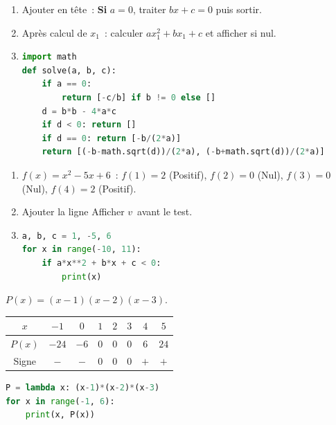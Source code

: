 
\begin{enumerate}
  \item Ajouter en t\^ete~: \textbf{Si} $a=0$, traiter $bx+c=0$ puis sortir.
  \item Apr\`es calcul de $x_1$~: calculer $ax_1^2+bx_1+c$ et afficher si nul.
  \item
\begin{lstlisting}[language=Python]
import math
def solve(a, b, c):
    if a == 0:
        return [-c/b] if b != 0 else []
    d = b*b - 4*a*c
    if d < 0: return []
    if d == 0: return [-b/(2*a)]
    return [(-b-math.sqrt(d))/(2*a), (-b+math.sqrt(d))/(2*a)]
\end{lstlisting}
\end{enumerate}


\begin{enumerate}
  \item $f(x)=x^2-5x+6$~: $f(1)=2$ (Positif), $f(2)=0$ (Nul),
        $f(3)=0$ (Nul), $f(4)=2$ (Positif).
  \item Ajouter la ligne \og Afficher $v$\fg\ avant le test.
  \item
\begin{lstlisting}[language=Python]
a, b, c = 1, -5, 6
for x in range(-10, 11):
    if a*x**2 + b*x + c < 0:
        print(x)
\end{lstlisting}
\end{enumerate}


$P(x)=(x-1)(x-2)(x-3)$.

\begin{center}
\begin{tabular}{c|ccccccc}
$x$ & $-1$ & $0$ & $1$ & $2$ & $3$ & $4$ & $5$ \\\hline
$P(x)$ & $-24$ & $-6$ & $0$ & $0$ & $0$ & $6$ & $24$ \\
Signe & $-$ & $-$ & $0$ & $0$ & $0$ & $+$ & $+$
\end{tabular}
\end{center}

\begin{lstlisting}[language=Python]
P = lambda x: (x-1)*(x-2)*(x-3)
for x in range(-1, 6):
    print(x, P(x))
\end{lstlisting}

